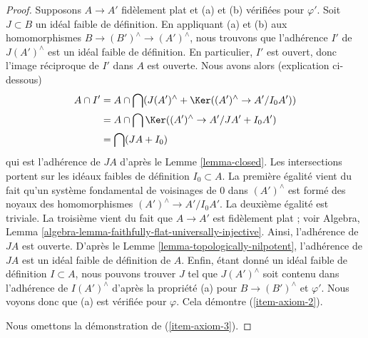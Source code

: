 \begin{proof}
\medskip\noindent
Supposons $A \to A'$ fidèlement plat et (a) et (b) vérifiées pour $\varphi'$.
Soit $J \subset B$ un idéal faible de définition. En appliquant (a) et (b)
aux homomorphismes $B \to (B')^\wedge \to (A')^\wedge$, nous trouvons que
l'adhérence $I'$ de $J(A')^\wedge$ est un idéal faible de définition.
En particulier, $I'$ est ouvert, donc l'image réciproque de $I'$
dans $A$ est ouverte. Nous avons alors (explication ci-dessous)
\begin{align*}
A \cap I'
& =
A \cap \bigcap (J(A')^\wedge + \Ker((A')^\wedge \to A'/I_0A')) \\
& =
A \cap \bigcap \Ker((A')^\wedge \to A'/JA' + I_0 A') \\
& = \bigcap (JA + I_0)
\end{align*}
qui est l'adhérence de $JA$ d'après le Lemme \ref{lemma-closed}.
Les intersections portent sur les idéaux faibles de définition $I_0 \subset A$.
La première égalité vient du fait qu'un système fondamental de voisinages de
$0$ dans $(A')^\wedge$ est formé des noyaux des homomorphismes $(A')^\wedge \to A'/I_0A'$.
La deuxième égalité est triviale. La troisième vient du fait que $A \to A'$
est fidèlement plat ; voir
Algebra, Lemma \ref{algebra-lemma-faithfully-flat-universally-injective}.
Ainsi, l'adhérence de $JA$ est ouverte. D'après le Lemme \ref{lemma-topologically-nilpotent},
l'adhérence de $JA$
est un idéal faible de définition de $A$. Enfin, étant donné un idéal faible
de définition $I \subset A$, nous pouvons trouver $J$ tel que
$J(A')^\wedge$ soit contenu dans l'adhérence de $I(A')^\wedge$
d'après la propriété (a) pour $B \to (B')^\wedge$ et $\varphi'$.
Nous voyons donc que (a) est vérifiée pour $\varphi$. Cela démontre (\ref{item-axiom-2}).

\medskip\noindent
Nous omettons la démonstration de (\ref{item-axiom-3}).
\end{proof}

